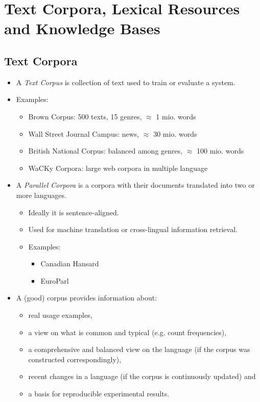\chapter{Text Corpora, Lexical Resources and Knowledge Bases} %
	\label{c:corpora}

    \section{Text Corpora} %
        \begin{itemize}
        	\item A \textit{Text Corpus} is collection of text used to train or evaluate a system.
        	\item Examples:
        		\begin{itemize}
        			\item Brown Corpus: 500 texts, 15 genres, \(\approx\) 1 mio. words
        			\item Wall Street Journal Campus: news, \(\approx\) 30 mio. words
        			\item British National Corpus: balanced among genres, \(\approx\) 100 mio. words
        			\item WaCKy Corpora: large web corpora in multiple language
        		\end{itemize}
        	\item A \textit{Parallel Corpora} is a corpora with their documents translated into two or more languages.
        		\begin{itemize}
        			\item Ideally it is sentence-aligned.
        			\item Used for machine translation or cross-lingual information retrieval.
        			\item Examples:
        				\begin{itemize}
        					\item Canadian Hansard
        					\item EuroParl
        				\end{itemize}
        		\end{itemize}
        	\item A (good) corpus provides information about:
        		\begin{itemize}
        			\item real usage examples,
        			\item a view on what is common and typical (e.g. count frequencies),
        			\item a comprehensive and balanced view on the language (if the corpus was constructed correspondingly),
        			\item recent changes in a language (if the corpus is continuously updated) and
        			\item a basis for reproducible experimental results.
        		\end{itemize}
        \end{itemize}

